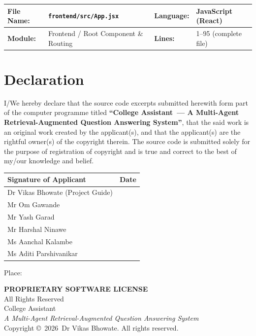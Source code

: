 \documentclass[11pt,a4paper]{article}
\newcommand{\FileHeader}[4]{%
  \begin{center}
  \renewcommand{\arraystretch}{1.3}
  \begin{tabularx}{\linewidth}{|>{\bfseries}l X|>{\bfseries}l X|}
    \hline
    \rowcolor{hdrblue}
    File Name: & #1 & Language: & #2 \\
    \hline
    \rowcolor{hdrblue}
    Module: & #3 & Lines: & #4 \\
    \hline
  \end{tabularx}
  \end{center}
  \vspace{-0.3em}
}
\newcommand{\OwnerName}{Dr Vikas Bhowate}
\newcommand{\SoftwareName}{College Assistant}
\newcommand{\SoftwareTagline}{A Multi-Agent Retrieval-Augmented Question Answering System}
\newcommand{\CopyrightYear}{2026}
\begin{document}


\vspace{1em}

\FileHeader{\nolinkurl{frontend/src/App.jsx}}{JavaScript (React)}{Frontend / Root Component \& Routing}{1--95 (complete file)}



\newpage

\section*{Declaration}

I/We hereby declare that the source code excerpts submitted herewith form
part of the computer programme titled \textbf{``\SoftwareName\ ---
\SoftwareTagline''}, that the said work is an original work created by the
applicant(s), and that the applicant(s) are the rightful owner(s) of the
copyright therein. The source code is submitted solely for the purpose of
registration of copyright and is true and correct to the best of my/our
knowledge and belief.

\vspace{2em}
\renewcommand{\arraystretch}{2.2}
\begin{tabularx}{\linewidth}{|X|X|}
\hline
\bfseries Signature of Applicant & \bfseries Date \\
\hline
Dr Vikas Bhowate (Project Guide) & \\
\hline
Mr Om Gawande & \\
\hline
Mr Yash Garad & \\
\hline
Mr Harshal Ninawe & \\
\hline
Ms Aanchal Kalambe & \\
\hline
Ms Aditi Parshivanikar & \\
\hline
\end{tabularx}

\vspace{1.5em}
\noindent Place: \underline{\hspace{6cm}}

\clearpage

\begin{center}
    {\LARGE \bfseries PROPRIETARY SOFTWARE LICENSE}\\[0.3em]
    {\large All Rights Reserved}\\[1.2em]
    {\Large \SoftwareName}\\[0.2em]
    {\normalsize \itshape \SoftwareTagline}\\[0.8em]
    Copyright \copyright\ \CopyrightYear\ \OwnerName. All rights reserved.
\end{center}
\end{document}
